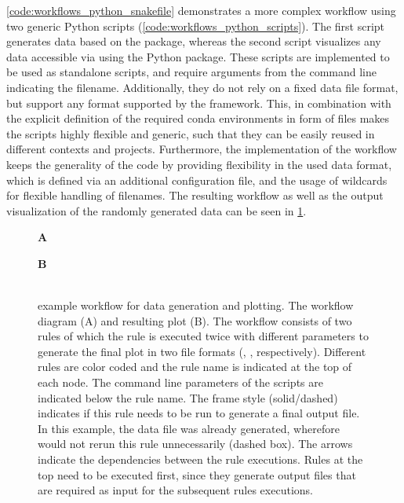 \cref{code:workflows_python_snakefile} demonstrates a more complex workflow using two generic Python scripts (\cref{code:workflows_python_scripts}). The first script generates data based on the  package, whereas the second script visualizes any data accessible via  using the Python  package. These scripts are implemented to be used as standalone scripts, and require arguments from the command line indicating the filename. Additionally, they do not rely on a fixed data file format, but support any format supported by the   framework. This, in combination with the explicit definition of the required conda environments in form of  files makes the scripts highly flexible and generic, such that they can be easily reused in different contexts and projects. Furthermore, the  implementation of the workflow keeps the generality of the code by providing flexibility in the used data format, which is defined via an additional configuration  file, and the usage of wildcards for flexible handling of filenames. The resulting  workflow as well as the output visualization of the randomly generated data can be seen in \cref{fig:python_demo}.

\begin{figure}
    \begin{minipage}[t]{0.4\textwidth}
    \textbf{A}\\
    
    \end{minipage}
    \begin{minipage}[t]{0.6\textwidth}
    \textbf{B}\\
    \\
    \end{minipage}
 \caption[ example workflow for data generation and plotting]{ example workflow for data generation and plotting. The workflow diagram (A) and resulting plot (B). The workflow consists of two rules of which the  rule is executed twice with different parameters to generate the final plot in two file formats (, , respectively). Different rules are color coded and the rule name is indicated at the top of each node.  The command line parameters of the scripts are indicated below the rule name. The frame style (solid/dashed) indicates if this rule needs to be run to generate a final output file. In this example, the data file was already generated, wherefore  would not rerun this rule unnecessarily (dashed box). The arrows indicate the dependencies between the rule executions. Rules at the top need to be executed first, since they generate output files that are required as input for the subsequent rules executions.}
\label{fig:python_demo}
\end{figure}


